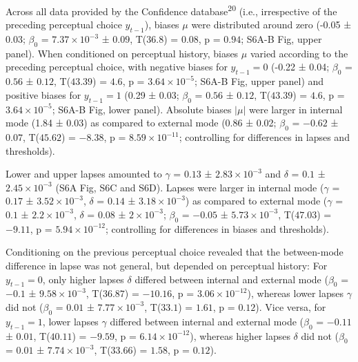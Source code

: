 \documentclass[
]{article}
\begin{document}
Across all data provided by the Confidence database\textsuperscript{20}
(i.e., irrespective of the preceding perceptual choice \(y_{t-1}\)),
biases \(\mu\) were distributed around zero (-0.05 ± 0.03; \(\beta_0\) =
\(\ensuremath{7.37\times 10^{-3}}\) ± \(0.09\), T(\(36.8\)) = \(0.08\),
p = \(0.94\); S6A-B Fig, upper panel). When conditioned
on perceptual history, biases \(\mu\) varied according to the preceding
perceptual choice, with negative biases for \(y_{t-1} = 0\) (-0.22 ±
0.04; \(\beta_0\) = \(0.56\) ± \(0.12\), T(\(43.39\)) = \(4.6\), p =
\(\ensuremath{3.64\times 10^{-5}}\); S6A-B Fig, upper
panel) and positive biases for \(y_{t-1} = 1\) (0.29 ± 0.03; \(\beta_0\)
= \(0.56\) ± \(0.12\), T(\(43.39\)) = \(4.6\), p =
\(\ensuremath{3.64\times 10^{-5}}\); S6A-B Fig, lower
panel). Absolute biases \(|\mu|\) were larger in internal mode (1.84 ±
0.03) as compared to external mode (0.86 ± 0.02; \(\beta_0\) = \(-0.62\)
± \(0.07\), T(\(45.62\)) = \(-8.38\), p =
\(\ensuremath{8.59\times 10^{-11}}\); controlling for differences in
lapses and thresholds).

Lower and upper lapses amounted to \(\gamma\) = \(0.13\) ±
\(\ensuremath{2.83\times 10^{-3}}\) and \(\delta\) = \(0.1\) ±
\(\ensuremath{2.45\times 10^{-3}}\) (S6A Fig, S6C and S6D).
Lapses were larger in internal mode (\(\gamma\) = \(0.17\) ±
\(\ensuremath{3.52\times 10^{-3}}\), \(\delta\) = \(0.14\) ±
\(\ensuremath{3.18\times 10^{-3}}\)) as compared to external mode
(\(\gamma\) = \(0.1\) ± \(\ensuremath{2.2\times 10^{-3}}\), \(\delta\) =
\(0.08\) ± \(\ensuremath{2\times 10^{-3}}\); \(\beta_0\) = \(-0.05\) ±
\(\ensuremath{5.73\times 10^{-3}}\), T(\(47.03\)) = \(-9.11\), p =
\(\ensuremath{5.94\times 10^{-12}}\); controlling for differences in
biases and thresholds).

Conditioning on the previous perceptual choice revealed that the
between-mode difference in lapse was not general, but depended on
perceptual history: For \(y_{t-1} = 0\), only higher lapses \(\delta\)
differed between internal and external mode (\(\beta_0\) = \(-0.1\) ±
\(\ensuremath{9.58\times 10^{-3}}\), T(\(36.87\)) = \(-10.16\), p =
\(\ensuremath{3.06\times 10^{-12}}\)), whereas lower lapses \(\gamma\)
did not (\(\beta_0\) = \(0.01\) ± \(\ensuremath{7.77\times 10^{-3}}\),
T(\(33.1\)) = \(1.61\), p = \(0.12\)). Vice versa, for \(y_{t-1} = 1\),
lower lapses \(\gamma\) differed between internal and external mode
(\(\beta_0\) = \(-0.11\) ± \(0.01\), T(\(40.11\)) = \(-9.59\), p =
\(\ensuremath{6.14\times 10^{-12}}\)), whereas higher lapses \(\delta\)
did not (\(\beta_0\) = \(0.01\) ± \(\ensuremath{7.74\times 10^{-3}}\),
T(\(33.66\)) = \(1.58\), p = \(0.12\)).
\end{document}
